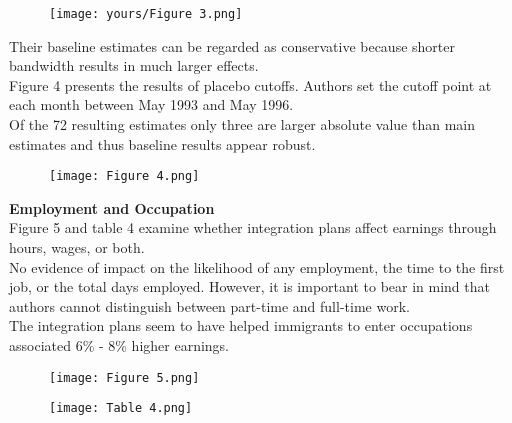 \documentclass[../root]{subfiles}
\begin{document}
    \begin{figure}[h]
        \texttt{[image: yours/Figure 3.png]}
    \end{figure}
    
    Their baseline estimates can be regarded as conservative because shorter bandwidth results in much larger effects. \\
    
    Figure 4 presents the results of placebo cutoffs. Authors set the cutoff point at each month between May 1993 and May 1996. \\
    Of the 72  resulting estimates only three are larger absolute value than main estimates and thus baseline results appear robust.
    \begin{figure}[h]
        \texttt{[image: Figure 4.png]}
    \end{figure}
    
    {\bf Employment and Occupation} \\
    Figure 5 and table 4 examine whether integration plans affect earnings through hours, wages, or both. \\
    
    No evidence of impact on the likelihood of any employment, the time to the first job, or the total days employed. However, it is important to bear in mind that authors cannot distinguish between part-time and full-time work. \\
    The integration plans seem to have helped immigrants to enter occupations associated 6\% - 8\% higher earnings.
    
    
    
    \begin{figure}[h]
        \texttt{[image: Figure 5.png]}
    \end{figure}
    
    \begin{figure}[h]
        \texttt{[image: Table 4.png]}
    \end{figure}
    
\end{document}
